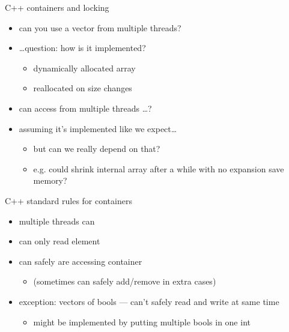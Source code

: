 \begin{frame}{C++ containers and locking}
    \begin{itemize}
    \item can you use a vector from multiple threads?
    \item \ldots question: how is it implemented?
        \begin{itemize}
        \item<2-> dynamically allocated array
        \item<2-> reallocated on size changes
        \end{itemize}
    \vspace{.5cm}
    \item<3-> can access from multiple threads \ldots {}?
    \item<3-> assuming it's implemented like we expect\ldots
        \begin{itemize}
        \item but can we really depend on that?
        \item e.g. could shrink internal array after a while with no expansion save memory?
        \end{itemize}
    \end{itemize}
\end{frame}

\begin{frame}[fragile,label=cppStdRules]{C++ standard rules for containers}
\begin{itemize}
    \item multiple threads can 
    \item can only read element 
    \vspace{.5cm}
    \item can safely  are accessing container
        \begin{itemize}
            \item (sometimes can safely add/remove in extra cases)
        \end{itemize}
    \vspace{.5cm}
    \item exception: vectors of bools --- can't safely read and write at same time
        \begin{itemize}
        \item might be implemented by putting multiple bools in one int
        \end{itemize}
    \end{itemize}
\end{frame}


